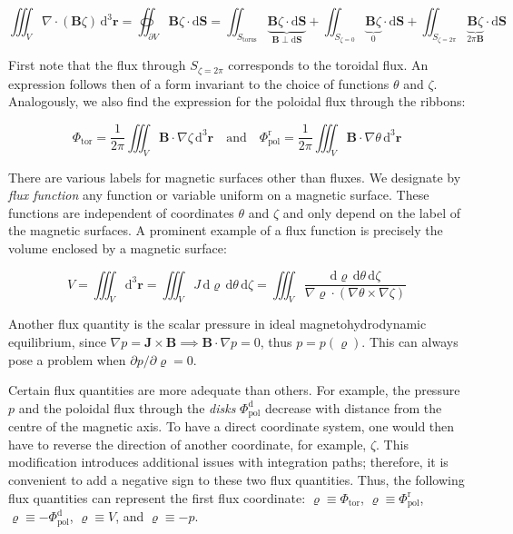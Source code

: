 \begin{equation}
    \iiint_V\nabla\cdot(\mathbf{B}\zeta)\,\mathrm{d}^3\mathbf{r}=\oiint_{\partial V}\mathbf{B}\zeta\cdot\mathrm{d}\mathbf{S}=\iint_{S_\text{torus}}\underbrace{\mathbf{B}\zeta\cdot\mathrm{d}\mathbf{S}}_{\mathbf{B}\perp\mathrm{d}\mathbf{S}}+\iint_{S_{\zeta=0}}\underbrace{\mathbf{B}\zeta}_0\cdot\mathrm{d}\mathbf{S}+\iint_{S_{\zeta=2\pi}}\underbrace{\mathbf{B}\zeta}_{2\pi\mathbf{B}}\cdot\mathrm{d}\mathbf{S}
\end{equation}

First note that the flux through $S_{\zeta=2\pi}$ corresponds to the toroidal flux. An expression follows then of a form invariant to the choice of functions $\theta$ and $\zeta$. Analogously, we also find the expression for the poloidal flux through the ribbons:

\begin{equation}
    \label{eq-6-34}
    \Phi_\text{tor}=\frac{1}{2\pi}\iiint_V\mathbf{B}\cdot\nabla\zeta\,\mathrm{d}^3\mathbf{r}\quad\text{and}\quad\Phi_\text{pol}^\text{r}=\frac{1}{2\pi}\iiint_V\mathbf{B}\cdot\nabla\theta\,\mathrm{d}^3\mathbf{r}
\end{equation}

There are various labels for magnetic surfaces other than fluxes. We designate by \textit{flux function} any function or variable uniform on a magnetic surface. These functions are independent of coordinates $\theta$ and $\zeta$ and only depend on the label of the magnetic surfaces. A prominent example of a flux function is precisely the volume enclosed by a magnetic surface:

\begin{equation}
    V=\iiint_V\mathrm{d}^3\mathbf{r}=\iiint_V J\,\mathrm{d}\varrho\,\mathrm{d}\theta\,\mathrm{d}\zeta=\iiint_V\frac{\mathrm{d}\varrho\,\mathrm{d}\theta\,\mathrm{d}\zeta}{\nabla\varrho\cdot(\nabla\theta\times\nabla\zeta)}
\end{equation}

Another flux quantity is the scalar pressure in ideal magnetohydrodynamic equilibrium, since $\nabla p=\mathbf{J}\times\mathbf{B}\implies\mathbf{B}\cdot\nabla p=0$, thus $p=p(\varrho)$. This can always pose a problem when $\partial p/\partial\varrho=0$.

\quad Certain flux quantities are more adequate than others. For example, the pressure $p$ and the poloidal flux through the \textit{disks} $\Phi_\text{pol}^\mathrm{d}$ decrease with distance from the centre of the magnetic axis. To have a direct coordinate system, one would then have to reverse the direction of another coordinate, for example, $\zeta$. This modification introduces additional issues with integration paths; therefore, it is convenient to add a negative sign to these two flux quantities. Thus, the following flux quantities can represent the first flux coordinate: $\varrho\equiv\Phi_\text{tor}$, $\varrho\equiv\Phi_\text{pol}^\text{r}$, $\varrho\equiv-\Phi_\text{pol}^\mathrm{d}$, $\varrho\equiv V$, and $\varrho\equiv -p$.

